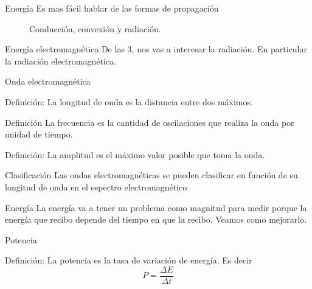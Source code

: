 \documentclass[handout,draft]{beamer}
\begin{document}
\begin{frame}{Energía}
  Es mas fácil hablar de las formas de propagación
  \begin{figure}
    \caption{Conducción, convexión y radiación.}
  \end{figure}
\end{frame}

\begin{frame}{Energía electromagnética}
  De las 3, nos vas a interesar la radiación. En particular la radiación electromagnética.
  \begin{figure}
  \end{figure}
\end{frame}

\begin{frame}{Onda electromagnética}
  \begin{block}{Definición:}
    La longitud de onda es la distancia entre dos máximos.
  \end{block}
  \begin{block}{Definición}
    La frecuencia es la cantidad de oscilaciones que realiza la onda por unidad de tiempo.
  \end{block}
  \begin{block}{Definición:}
    La amplitud es el máximo valor posible que toma la onda.
  \end{block}
\end{frame}

\begin{frame}{Clasificación}
  Las ondas electromagnéticas se pueden clasificar en función de su longitud de onda en el espectro electromagnético
  \begin{figure}
  \end{figure}
\end{frame}

\begin{frame}{Energía}
  La energía va a tener un problema como magnitud para medir porque la energía que recibo depende del tiempo en que la recibo. Veamos como mejorarlo.
\end{frame}

\begin{frame}{Potencia}
  \begin{block}{Definición:}
    La potencia es la tasa de variación de energía. Es decir
    \begin{equation}
      P = \frac{\Delta E}{\Delta t}
    \end{equation}
  \end{block}
\end{frame}
\end{document}
